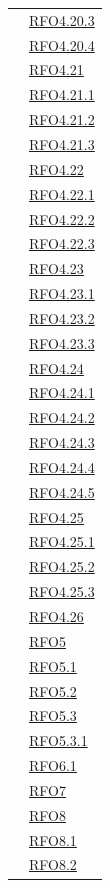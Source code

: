 \begin{longtable}{|>{\centering}m{5cm}|m{5cm}<{\centering}|}
& \hyperlink{RFO4.20.3}{RFO4.20.3}\\
& \hyperlink{RFO4.20.4}{RFO4.20.4}\\
& \hyperlink{RFO4.21}{RFO4.21}\\
& \hyperlink{RFO4.21.1}{RFO4.21.1}\\
& \hyperlink{RFO4.21.2}{RFO4.21.2}\\
& \hyperlink{RFO4.21.3}{RFO4.21.3}\\
& \hyperlink{RFO4.22}{RFO4.22}\\
& \hyperlink{RFO4.22.1}{RFO4.22.1}\\
& \hyperlink{RFO4.22.2}{RFO4.22.2}\\
& \hyperlink{RFO4.22.3}{RFO4.22.3}\\
& \hyperlink{RFO4.23}{RFO4.23}\\
& \hyperlink{RFO4.23.1}{RFO4.23.1}\\
& \hyperlink{RFO4.23.2}{RFO4.23.2}\\
& \hyperlink{RFO4.23.3}{RFO4.23.3}\\
& \hyperlink{RFO4.24}{RFO4.24}\\
& \hyperlink{RFO4.24.1}{RFO4.24.1}\\
& \hyperlink{RFO4.24.2}{RFO4.24.2}\\
& \hyperlink{RFO4.24.3}{RFO4.24.3}\\
& \hyperlink{RFO4.24.4}{RFO4.24.4}\\
& \hyperlink{RFO4.24.5}{RFO4.24.5}\\
& \hyperlink{RFO4.25}{RFO4.25}\\
& \hyperlink{RFO4.25.1}{RFO4.25.1}\\
& \hyperlink{RFO4.25.2}{RFO4.25.2}\\
& \hyperlink{RFO4.25.3}{RFO4.25.3}\\
& \hyperlink{RFO4.26}{RFO4.26}\\
& \hyperlink{RFO5}{RFO5}\\
& \hyperlink{RFO5.1}{RFO5.1}\\
& \hyperlink{RFO5.2}{RFO5.2}\\
& \hyperlink{RFO5.3}{RFO5.3}\\
& \hyperlink{RFO5.3.1}{RFO5.3.1}\\
& \hyperlink{RFO6.1}{RFO6.1}\\
& \hyperlink{RFO7}{RFO7}\\
& \hyperlink{RFO8}{RFO8}\\
& \hyperlink{RFO8.1}{RFO8.1}\\
& \hyperlink{RFO8.2}{RFO8.2}\\

\end{longtable}

